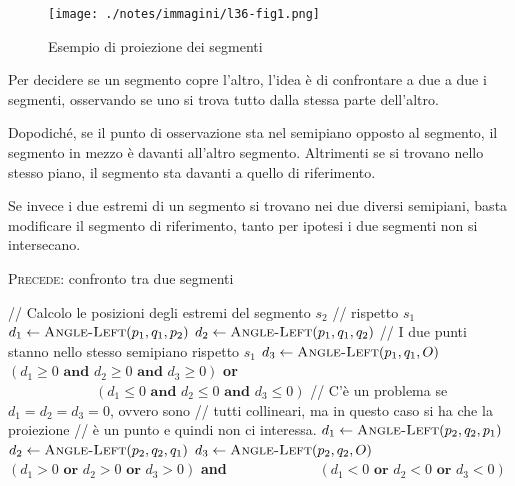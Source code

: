 \begin{figure}[htbp]
\centering
\texttt{[image: ./notes/immagini/l36-fig1.png]}
\caption{Esempio di proiezione dei segmenti}
\end{figure}

Per decidere se un segmento copre l'altro, l'idea è di confrontare a due a due i segmenti, osservando se uno si trova tutto dalla stessa parte dell'altro.

Dopodiché, se il punto di osservazione sta nel semipiano opposto al segmento, il segmento in mezzo è davanti all'altro segmento. Altrimenti se si trovano nello stesso piano, il segmento sta davanti a quello di riferimento.

Se invece i due estremi di un segmento si trovano nei due diversi semipiani, basta modificare il segmento di riferimento, tanto per
ipotesi i due segmenti non si intersecano.

\begin{breakablealgorithm}
	\caption{\textsc{Precede}: confronto tra due segmenti}
	\begin{algorithmic}[1]
    \State // Calcolo le posizioni degli estremi del segmento $s_2$
    \State // rispetto $s_1$
    \State $d_1 \gets \textsc{Angle-Left}(p_1, q_1, p_2)$
    \State $d_2 \gets \textsc{Angle-Left}(p_1, q_1, q_2)$
        \State // I due punti stanno nello stesso semipiano rispetto $s_1$
        \State $d_3 \gets \textsc{Angle-Left}(p_1,q_1, O)$
        \State \Return $(d_1 \geq 0\textbf{ and } d_2 \geq 0 \textbf{ and } d_3 \geq 0)$ \textbf{or }
        \Statex $\qquad \qquad \qquad \:(d_1 \leq 0 \textbf{ and } d_2 \leq 0 \textbf{ and } d_3 \leq 0)$
        \State // C'è un problema se $d_1 = d_2 = d_3 =0$, ovvero sono
        \State // tutti collineari, ma in questo caso si ha che la proiezione
        \State // è un punto e quindi non ci interessa.
    \Else
        \State $d_1 \gets \textsc{Angle-Left}(p_2, q_2, p_1)$
        \State $d_2 \gets \textsc{Angle-Left}(p_2, q_2, q_1)$
        \State $d_3 \gets \textsc{Angle-Left}(p_2,q_2, O)$
        \State \Return $(d_1 > 0 \textbf{ or } d_2 > 0 \textbf{ or } d_3 > 0)$ \textbf{and}
        \Statex $\qquad \qquad \qquad \:(d_1 < 0 \textbf{ or } d_2 < 0 \textbf{ or } d_3 < 0)$
    \EndIf
\EndFunction
\end{algorithmic}
\end{breakablealgorithm}

